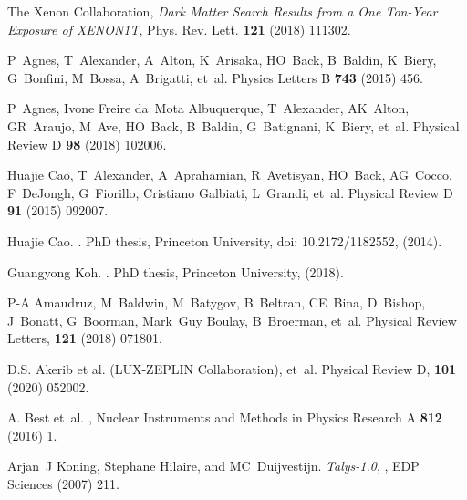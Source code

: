 \documentclass[a4paper,11pt]{article}
\begin{document}
\begin{thebibliography}{99}
The Xenon Collaboration, \emph{Dark Matter Search Results from a One Ton-Year Exposure of XENON1T}, Phys. Rev. Lett. {\bf 121}  (2018) 111302.

P~Agnes, T~Alexander, A~Alton, K~Arisaka, HO~Back, B~Baldin, K~Biery,
  G~Bonfini, M~Bossa, A~Brigatti, et~al.
\newblock Physics Letters B {\bf 743} (2015) 456.

P~Agnes, Ivone Freire da~Mota Albuquerque, T~Alexander, AK~Alton, GR~Araujo,
  M~Ave, HO~Back, B~Baldin, G~Batignani, K~Biery, et~al.
\newblock Physical Review D {\bf 98}  (2018) 102006.

Huajie Cao, T~Alexander, A~Aprahamian, R~Avetisyan, HO~Back, AG~Cocco,
  F~DeJongh, G~Fiorillo, Cristiano Galbiati, L~Grandi, et~al.
\newblock Physical Review D {\bf 91} (2015) 092007.

Huajie Cao.
.
\newblock PhD thesis, Princeton University, doi: 10.2172/1182552, (2014).

Guangyong Koh.
.
\newblock PhD thesis, Princeton University, (2018).

P-A Amaudruz, M~Baldwin, M~Batygov, B~Beltran, CE~Bina, D~Bishop, J~Bonatt,
  G~Boorman, Mark~Guy Boulay, B~Broerman, et~al.
\newblock Physical Review Letters, {\bf 121} (2018) 071801.

D.S. Akerib et al. (LUX-ZEPLIN Collaboration), et~al.
\newblock Physical Review D, {\bf 101}  (2020) 052002.

A. Best et~al.
, 
Nuclear Instruments and Methods in Physics Research A {\bf 812}   (2016) 1.

Arjan~J Koning, Stephane Hilaire, and MC~Duijvestijn.
\newblock \emph{Talys-1.0},
, EDP Sciences (2007) 211.


\end{thebibliography}
\end{document}
